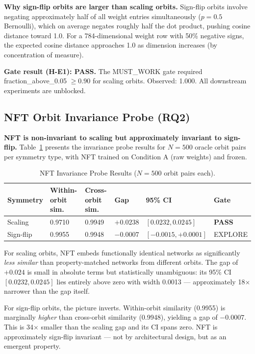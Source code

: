 \textbf{Why sign-flip orbits are larger than scaling orbits.} Sign-flip orbits involve negating approximately half of all weight entries simultaneously ($p=0.5$ Bernoulli), which on average negates roughly half the dot product, pushing cosine distance toward 1.0. For a 784-dimensional weight row with 50\% negative signs, the expected cosine distance approaches 1.0 as dimension increases (by concentration of measure).

\textbf{Gate result (H-E1): PASS.} The MUST\_WORK gate required fraction\_above\_0.05 $\geq 0.90$ for scaling orbits. Observed: 1.000. All downstream experiments are unblocked.

\subsection{NFT Orbit Invariance Probe (RQ2)}

\textbf{NFT is non-invariant to scaling but approximately invariant to sign-flip.} Table~\ref{tab:invariance} presents the invariance probe results for $N=500$ oracle orbit pairs per symmetry type, with NFT trained on Condition A (raw weights) and frozen.

\begin{table}[h]
\centering
\caption{NFT Invariance Probe Results ($N=500$ orbit pairs each).}
\label{tab:invariance}
\begin{tabular}{llllll}
\toprule
Symmetry & Within-orbit sim. & Cross-orbit sim. & Gap & 95\% CI & Gate \\
\midrule
Scaling & 0.9710 & 0.9949 & $+0.0238$ & $[0.0232, 0.0245]$ & \textbf{PASS} \\
Sign-flip & 0.9955 & 0.9948 & $-0.0007$ & $[-0.0015, +0.0001]$ & EXPLORE \\
\bottomrule
\end{tabular}
\end{table}

For scaling orbits, NFT embeds functionally identical networks as significantly \textit{less similar} than property-matched networks from different orbits. The gap of $+0.024$ is small in absolute terms but statistically unambiguous: its 95\% CI $[0.0232, 0.0245]$ lies entirely above zero with width 0.0013 --- approximately 18$\times$ narrower than the gap itself.

For sign-flip orbits, the picture inverts. Within-orbit similarity (0.9955) is marginally \textit{higher} than cross-orbit similarity (0.9948), yielding a gap of $-0.0007$. This is 34$\times$ smaller than the scaling gap and its CI spans zero. NFT is approximately sign-flip invariant --- not by architectural design, but as an emergent property.

